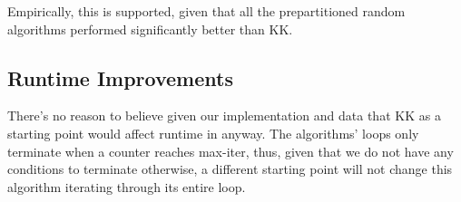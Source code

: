 \documentclass[11pt]{scrartcl}
\theoremstyle{dotlessP}
\theoremstyle{dotlessN}
\theoremstyle{dotN}
\begin{document}
\begin{itemize}
    Empirically, this is supported, given that all the prepartitioned random algorithms performed significantly better than KK. 
    \subsection{Runtime Improvements}
    There's no reason to believe given our implementation and data that KK as a starting point would affect runtime in anyway. The algorithms' loops only terminate when a counter reaches max-iter, thus, given that we do not have any conditions to terminate otherwise, a different starting point will not change this algorithm iterating through its entire loop. 
\end{itemize}
\end{document}
